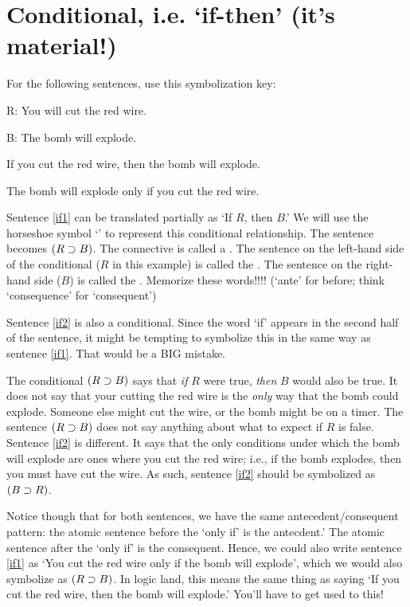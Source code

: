 \newpage

\section{Conditional, i.e. `if-then' (it's material!)}
For the following sentences, use this symbolization key:

\begin{ekey}
\item[R:] You will cut the red wire.
\item[B:] The bomb will explode.
\end{ekey}

\begin{earg}
\item[\ex{if1}] If you cut the red wire, then the bomb will explode.
\item[\ex{if2}] The bomb will explode only if you cut the red wire.
\end{earg}

Sentence \ref{if1} can be translated partially as `If $R$, then $B$.' We will use the horseshoe symbol `\eif' to represent this conditional relationship. The sentence becomes $(R\supset B)$. The connective is called a . The sentence on the left-hand side of the conditional ($R$ in this example) is called the . The sentence on the right-hand side ($B$) is called the . Memorize these words!!!! (`ante' for before; think `consequence' for `consequent')

Sentence \ref{if2} is also a conditional. Since the word `if' appears in the second half of the sentence, it might be tempting to symbolize this in the same way as sentence \ref{if1}. That would be a BIG mistake.

The conditional $(R\supset B)$ says that \emph{if} $R$ were true, \emph{then} $B$ would also be true. It does not say that your cutting the red wire is the \emph{only} way that the bomb could explode. Someone else might cut the wire, or the bomb might be on a timer. The sentence $(R\supset B)$ does not say anything about what to expect if $R$ is false. 
Sentence \ref{if2} is different. It says that the only conditions under which the bomb will explode are ones where you cut the red wire; i.e., if the bomb explodes, then you must have cut the wire. As such, sentence \ref{if2} should be symbolized as $(B \supset R)$. 

Notice though that for both sentences, we have the same antecedent/consequent pattern: the atomic sentence before the `only if' is the antecdent.' The atomic sentence after the `only if' is the consequent. Hence, we could also write sentence \ref{if1} as `You cut the red wire only if the bomb will explode', which we would also symbolize as $(R\supset B)$. In logic land, this means the same thing as saying `If you cut the red wire, then the bomb will explode.' You'll have to get used to this! 

